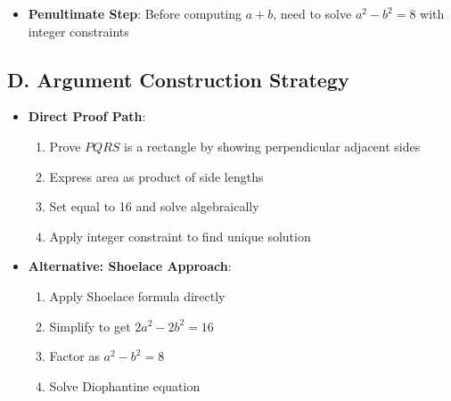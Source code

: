 \documentclass[]{article}
\begin{document}
\begin{strategicbox}
\begin{itemize}[leftmargin=*]
    \item \textbf{Penultimate Step}: Before computing $a+b$, need to solve $a^2 - b^2 = 8$ with integer constraints
\end{itemize}

\subsection*{D. Argument Construction Strategy}
\begin{itemize}[leftmargin=*]
    \item \textbf{Direct Proof Path}:
    \begin{enumerate}
        \item Prove $PQRS$ is a rectangle by showing perpendicular adjacent sides
        \item Express area as product of side lengths
        \item Set equal to 16 and solve algebraically
        \item Apply integer constraint to find unique solution
    \end{enumerate}
    
    \item \textbf{Alternative: Shoelace Approach}:
    \begin{enumerate}
        \item Apply Shoelace formula directly
        \item Simplify to get $2a^2 - 2b^2 = 16$
        \item Factor as $a^2 - b^2 = 8$
        \item Solve Diophantine equation
    \end{enumerate}
\end{itemize}
\end{strategicbox}
\end{document}
